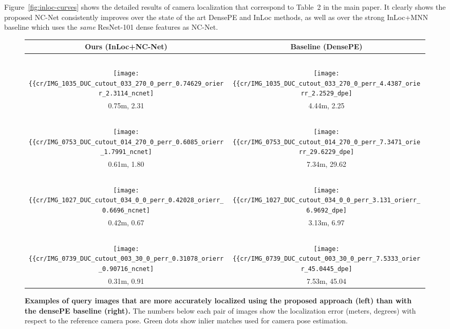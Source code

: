 \documentclass{article}
\begin{document}
Figure~\ref{fig:inloc-curves} shows the detailed results of camera localization that correspond to Table~2 in the main paper. It clearly shows the proposed NC-Net consistently improves over the state of the art DensePE and InLoc methods, as well as over the strong InLoc+MNN baseline which uses the \emph{same} ResNet-101 dense features as NC-Net.

\begin{figure}[tbp]
  \centering
  \begingroup
  \renewcommand{\arraystretch}{0.5}
  \begin{tabular}{@{\hskip 1pt}c@{\hskip 6pt}|@{\hskip 6pt}c@{\hskip 1pt}}
    Ours (InLoc+NC-Net) & Baseline (DensePE) \\ \hline
    ~ & ~ \\ 
    \texttt{[image: \{\{cr/IMG\_1035\_DUC\_cutout\_033\_270\_0\_perr\_0.74629\_orierr\_2.3114\_ncnet]}}} &    \texttt{[image: \{\{cr/IMG\_1035\_DUC\_cutout\_033\_270\_0\_perr\_4.4387\_orierr\_2.2529\_dpe]}}} \\
    0.75m, 2.31 & 4.44m, 2.25 \\ \hline
    ~ & ~ \\ 
    \texttt{[image: \{\{cr/IMG\_0753\_DUC\_cutout\_014\_270\_0\_perr\_0.6085\_orierr\_1.7991\_ncnet]}}} &    \texttt{[image: \{\{cr/IMG\_0753\_DUC\_cutout\_014\_270\_0\_perr\_7.3471\_orierr\_29.6229\_dpe]}}} \\
    0.61m, 1.80 & 7.34m, 29.62 \\ \hline
    ~ & ~ \\ 
     \texttt{[image: \{\{cr/IMG\_1027\_DUC\_cutout\_034\_0\_0\_perr\_0.42028\_orierr\_0.6696\_ncnet]}}} &    \texttt{[image: \{\{cr/IMG\_1027\_DUC\_cutout\_034\_0\_0\_perr\_3.131\_orierr\_6.9692\_dpe]}}} \\
    0.42m, 0.67 & 3.13m, 6.97 \\ \hline
    ~ & ~ \\ 
     \texttt{[image: \{\{cr/IMG\_0739\_DUC\_cutout\_003\_30\_0\_perr\_0.31078\_orierr\_0.90716\_ncnet]}}} &    \texttt{[image: \{\{cr/IMG\_0739\_DUC\_cutout\_003\_30\_0\_perr\_7.5333\_orierr\_45.0445\_dpe]}}} \\
    0.31m, 0.91 & 7.53m, 45.04 \\ 
  \end{tabular}
  \endgroup
  \vspace{2pt}
  \caption{{\bf Examples of query images that are more accurately localized using the proposed approach (left) than with the densePE baseline (right).} The numbers below each pair of images show the localization error (meters, degrees) with respect to the reference camera pose. Green dots show inlier matches used for camera pose estimation.}
  \label{fig:densePE}
\end{figure}
\end{document}
